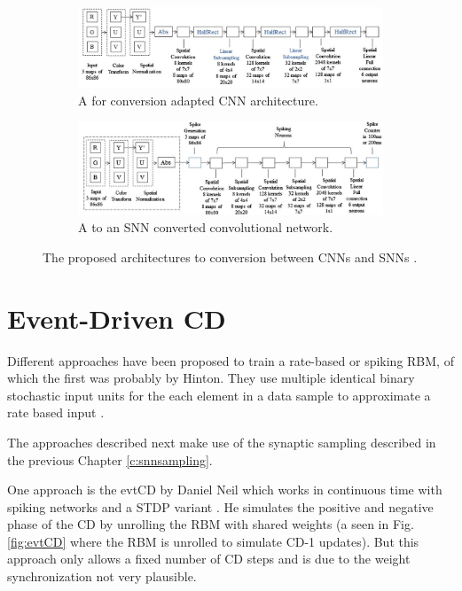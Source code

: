 \begin{figure}
	\centering
	\begin{subfigure}[t]{.50\textwidth}
  		\centering
  		\includegraphics[width=.9\linewidth]{imgs/cnn_snn_conv1.jpg}
  		\caption{A for conversion adapted CNN architecture.}
  		\label{fig:sub1}
	\end{subfigure}%
	\begin{subfigure}[t]{.50\textwidth}
  		\centering
  		\includegraphics[width=.9\linewidth]{imgs/cnn_snn_conv2.jpg}
  		\caption{A to an SNN converted convolutional network.}
  		\label{fig:sub2}
	\end{subfigure}
	\caption{The proposed architectures to conversion between CNNs and SNNs \cite{Cao2014}. }
	\label{fig:csnnconv}
\end{figure}

\section{Event-Driven CD} \label{c:ecd}

Different approaches have been proposed to train a rate-based or spiking RBM, of which the first was probably by Hinton.
They use multiple identical binary stochastic input units for the each element in a data sample to approximate a rate based input \cite{Teh2005}.

The approaches described next make use of the synaptic sampling described in the previous Chapter \ref{c:snnsampling}.

One approach is the evtCD by Daniel Neil which works in continuous time with spiking networks and a STDP variant \cite{Diehl2015}.
He simulates the positive and negative phase of the CD by unrolling the RBM with shared weights (a seen in Fig. \ref{fig:evtCD} where the RBM is unrolled to simulate CD-1 updates). 
But this approach only allows a fixed number of CD steps and is due to the weight synchronization not very plausible.

